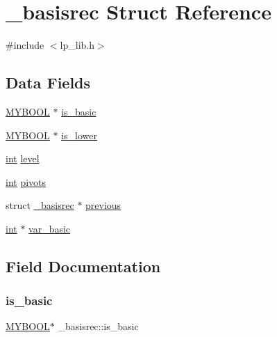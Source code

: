 \hypertarget{struct__basisrec}{}\section{\+\_\+basisrec Struct Reference}
\label{struct__basisrec}


{\ttfamily \#include $<$lp\+\_\+lib.\+h$>$}

\subsection*{Data Fields}
\begin{DoxyCompactItemize}
\item 
\hyperlink{lp__lib_8h_aad848328fb3018217ac9f01d97b6bd88}{M\+Y\+B\+O\+OL} $\ast$ \hyperlink{struct__basisrec_ae58fc135f7354052085b8790da18904e}{is\+\_\+basic}
\item 
\hyperlink{lp__lib_8h_aad848328fb3018217ac9f01d97b6bd88}{M\+Y\+B\+O\+OL} $\ast$ \hyperlink{struct__basisrec_a7937ee78df805e77bb67197b93ade770}{is\+\_\+lower}
\item 
\hyperlink{lp__lib_8h_adeb9ec6400320e4923ac9d836d509ddb}{int} \hyperlink{struct__basisrec_a5a92263af860403dfbd6a09d3628e8f5}{level}
\item 
\hyperlink{lp__lib_8h_adeb9ec6400320e4923ac9d836d509ddb}{int} \hyperlink{struct__basisrec_ac94d7dab515bc47c479433fff1b58357}{pivots}
\item 
struct \hyperlink{struct__basisrec}{\+\_\+basisrec} $\ast$ \hyperlink{struct__basisrec_a6e08660beef3064b5608f937b1309daf}{previous}
\item 
\hyperlink{lp__lib_8h_adeb9ec6400320e4923ac9d836d509ddb}{int} $\ast$ \hyperlink{struct__basisrec_aaecfeb2087fa8fae35f72ae339ea558b}{var\+\_\+basic}
\end{DoxyCompactItemize}


\subsection{Field Documentation}
\mbox{\label{struct__basisrec_ae58fc135f7354052085b8790da18904e}} 
\subsubsection{\texorpdfstring{is\+\_\+basic}{is\_basic}}
{\footnotesize\ttfamily \hyperlink{lp__lib_8h_aad848328fb3018217ac9f01d97b6bd88}{M\+Y\+B\+O\+OL}$\ast$ \+\_\+basisrec\+::is\+\_\+basic}

